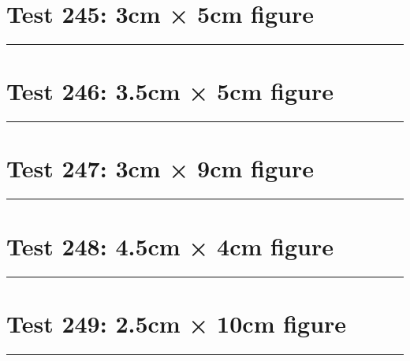 \documentclass[a4paper,11pt]{article}
\begin{document}
\section*{Test 245: 3cm × 5cm figure}
\begin{swarmwrap}%
  \begin{minipage}[t]{3cm}
    \centering
    \rule{\linewidth}{5cm}
  \end{minipage}%
\end{swarmwrap}%
\swarmwrapnext
\lipsum[148]
\lipsum[149]
\lipsum[150]
\lipsum[1]
\section*{Test 246: 3.5cm × 5cm figure}
\begin{swarmwrap}%
  \begin{minipage}[t]{3cm}
    \centering
    \rule{\linewidth}{5cm}
  \end{minipage}%
\end{swarmwrap}%
\swarmwrapnext
\lipsum[13]
\lipsum[14]
\lipsum[15]
\lipsum[16]
\lipsum[17]
\lipsum[18]
\section*{Test 247: 3cm × 9cm figure}
\begin{swarmwrap}%
  \begin{minipage}[t]{3cm}
    \centering
    \rule{\linewidth}{9cm}
  \end{minipage}%
\end{swarmwrap}%
\swarmwrapnext
\lipsum[100]
\lipsum[101]
\lipsum[102]
\lipsum[103]
\lipsum[104]
\lipsum[105]
\section*{Test 248: 4.5cm × 4cm figure}
\begin{swarmwrap}%
  \begin{minipage}[t]{4cm}
    \centering
    \rule{\linewidth}{4cm}
  \end{minipage}%
\end{swarmwrap}%
\swarmwrapnext
\lipsum[11]
\lipsum[12]
\lipsum[13]
\lipsum[14]
\lipsum[15]
\lipsum[16]
\section*{Test 249: 2.5cm × 10cm figure}
\begin{swarmwrap}%
  \begin{minipage}[t]{2cm}
    \centering
    \rule{\linewidth}{10cm}
  \end{minipage}%
\end{swarmwrap}%
\swarmwrapnext
\lipsum[27]
\lipsum[28]
\lipsum[29]
\lipsum[30]
\lipsum[31]
\end{document}
